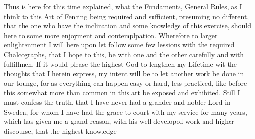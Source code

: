 \newpage


\newpage


Thus is here for this time explained, what the Fundaments, General
Rules, as I think to this Art of Fencing being required and
sufficient, presuming no different, that the one who have the
inclination and some knowledge of this exercise, should here to some
more enjoyment and contemplpation. Wherefore to larger enlightenment I
will here upon let follow some few lessions with the required
Chalcographs, that I hope to this, be with one and the other carefully
and with fulfillmen. If it would please the highest God to lengthen my
Lifetime wit the thoughts that I herein express,
my intent will be to let another work be done in our tounge, for as
everything can happen easy or hard, less practiced, like before this
somewhat more than common in this art be exposed and exhibited. Still
I must confess the truth, that I have never had a grander and nobler
Lord in Sweden, for whom I have had the grace to court with my service
for many years, which has given me a grand reason, with his
well-developed work and higher discourse, that the highest knowledge
